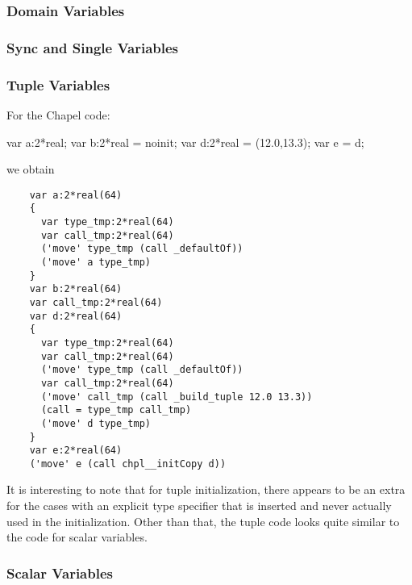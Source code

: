 \subsubsection{Domain Variables}

\subsubsection{Sync and Single Variables}

\subsubsection{Tuple Variables}

For the Chapel code:
\begin{chapel}
  var a:2*real;
  var b:2*real = noinit;
  var d:2*real = (12.0,13.3);
  var e = d;
\end{chapel}
we obtain
\begin{verbatim}
    var a:2*real(64)
    {
      var type_tmp:2*real(64)
      var call_tmp:2*real(64)
      ('move' type_tmp (call _defaultOf))
      ('move' a type_tmp)
    }
    var b:2*real(64)
    var call_tmp:2*real(64)
    var d:2*real(64)
    {
      var type_tmp:2*real(64)
      var call_tmp:2*real(64)
      ('move' type_tmp (call _defaultOf))
      var call_tmp:2*real(64)
      ('move' call_tmp (call _build_tuple 12.0 13.3))
      (call = type_tmp call_tmp)
      ('move' d type_tmp)
    }
    var e:2*real(64)
    ('move' e (call chpl__initCopy d))
\end{verbatim}
It is interesting to note that for tuple initialization, there appears to be an extra
 for the cases with an explicit type specifier that is inserted and never
actually used in the initialization.   Other than that, the tuple code looks quite similar
to the code for scalar variables.

\subsubsection{Scalar Variables}

